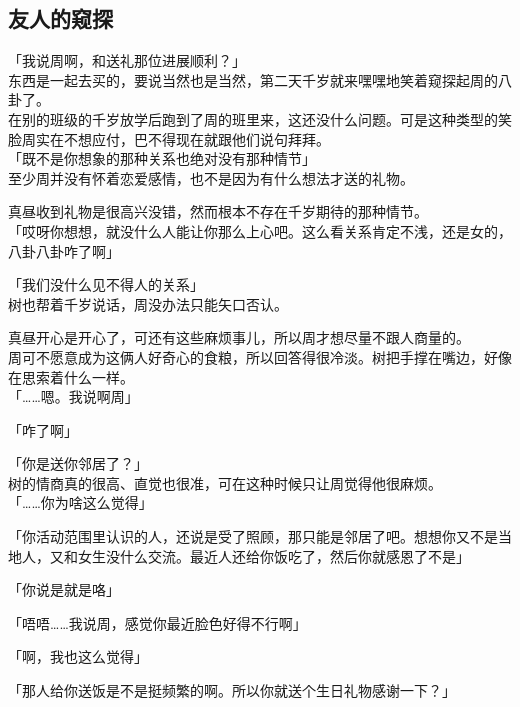 \subsection{友人的窥探}

「我说周啊，和送礼那位进展顺利？」\\

东西是一起去买的，要说当然也是当然，第二天千岁就来嘿嘿地笑着窥探起周的八卦了。\\

在别的班级的千岁放学后跑到了周的班里来，这还没什么问题。可是这种类型的笑脸周实在不想应付，巴不得现在就跟他们说句拜拜。\\

「既不是你想象的那种关系也绝对没有那种情节」\\

至少周并没有怀着恋爱感情，也不是因为有什么想法才送的礼物。

真昼收到礼物是很高兴没错，然而根本不存在千岁期待的那种情节。\\

「哎呀你想想，就没什么人能让你那么上心吧。这么看关系肯定不浅，还是女的，八卦八卦咋了啊」

「我们没什么见不得人的关系」\\

树也帮着千岁说话，周没办法只能矢口否认。

真昼开心是开心了，可还有这些麻烦事儿，所以周才想尽量不跟人商量的。\\

周可不愿意成为这俩人好奇心的食粮，所以回答得很冷淡。树把手撑在嘴边，好像在思索着什么一样。\\

「……嗯。我说啊周」

「咋了啊」

「你是送你邻居了？」\\

树的情商真的很高、直觉也很准，可在这种时候只让周觉得他很麻烦。\\

「……你为啥这么觉得」

「你活动范围里认识的人，还说是受了照顾，那只能是邻居了吧。想想你又不是当地人，又和女生没什么交流。最近人还给你饭吃了，然后你就感恩了不是」

「你说是就是咯」

「唔唔……我说周，感觉你最近脸色好得不行啊」

「啊，我也这么觉得」

「那人给你送饭是不是挺频繁的啊。所以你就送个生日礼物感谢一下？」\\

